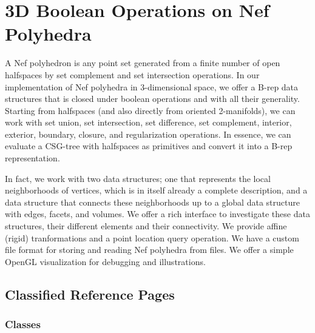 
\chapter{3D Boolean Operations on Nef Polyhedra}
\label{chapterNef3Ref}



A Nef polyhedron is any point set generated from a finite number of
open halfspaces by set complement and set intersection operations.  In
our implementation of Nef polyhedra in 3-dimensional space, we offer a
B-rep data structures that is closed under boolean operations and with
all their generality. Starting from halfspaces (and also directly from
oriented 2-manifolds), we can work with set union, set intersection,
set difference, set complement, interior, exterior, boundary, closure,
and regularization operations. In essence, we can evaluate a CSG-tree
with halfspaces as primitives and convert it into a B-rep
representation.

In fact, we work with two data structures; one that represents the
local neighborhoods of vertices, which is in itself already a complete
description, and a data structure that connects these neighborhoods up
to a global data structure with edges, facets, and volumes. We offer a
rich interface to investigate these data structures, their different
elements and their connectivity. We provide affine (rigid)
tranformations and a point location query operation. We have a custom
file format for storing and reading Nef polyhedra from files. We offer
a simple OpenGL visualization for debugging and illustrations.

\section{Classified Reference Pages}

\subsection*{Classes}

